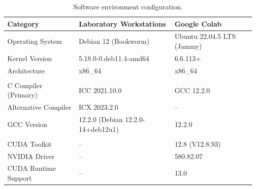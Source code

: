 \begin{table}[H]
\centering
\caption{Software environment configuration.}
\label{tab:software_env}
\begin{tabular}{lll}
\toprule
\textbf{Category} & \textbf{Laboratory Workstations} & \textbf{Google Colab} \\
\midrule
Operating System & Debian 12 (Bookworm) & Ubuntu 22.04.5 LTS (Jammy) \\
Kernel Version & 5.18.0-0.deb11.4-amd64 & 6.6.113+ \\
Architecture & x86\_64 & x86\_64 \\
\\
C Compiler (Primary) & ICC 2021.10.0 & GCC 12.2.0 \\
Alternative Compiler & ICX 2023.2.0 & -- \\
GCC Version & 12.2.0 (Debian 12.2.0-14+deb12u1) & 12.2.0 \\
\\
CUDA Toolkit & -- & 12.8 (V12.8.93) \\
NVIDIA Driver & -- & 580.82.07 \\
CUDA Runtime Support & -- & 13.0 \\
\bottomrule
\end{tabular}
\end{table}
